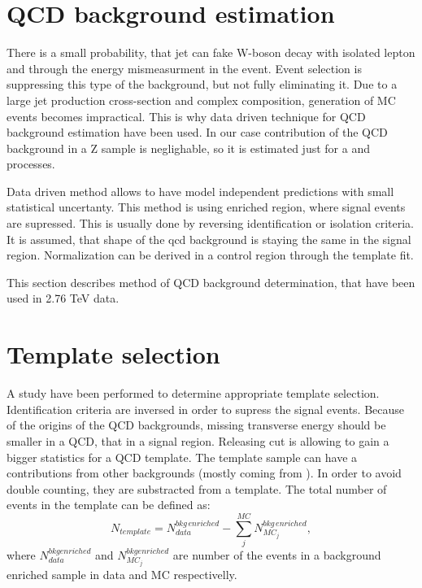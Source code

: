 \section{QCD background estimation}

There is a small probability, that jet can fake W-boson decay with isolated lepton and \etmiss through the energy mismeasurment in the event.  Event selection is suppressing this type of the background, but not fully eliminating it. Due to a large jet production cross-section and complex composition, generation of MC events becomes impractical. This is why data driven technique for QCD background estimation have been used. In our case contribution of the QCD background  in a Z sample is neglighable, so it is estimated just for a \wenu and \wmunu processes. 

Data driven method allows to have model independent predictions with small statistical uncertanty. This method is using \qcd enriched region, where signal events are supressed. This is usually done by reversing identification or isolation criteria. It is assumed, that shape of the qcd background is staying the same in the signal region. Normalization can  be derived in a control region through the template fit. 

This section describes method of QCD background determination, that have been used in 2.76 TeV data. 

\section{Template selection}

A study have been performed to determine appropriate template selection. Identification criteria are inversed in order to supress the signal events. Because of the origins of the QCD backgrounds, missing transverse energy \etmiss should be smaller in a QCD, that in a signal region. Releasing \etmiss cut is allowing to gain a bigger statistics for a QCD template.  The template sample can have a contributions from other backgrounds (mostly coming from \wlnu). In order to avoid double counting, they are substracted from a template. The total number of events in the template can be defined as:
\begin{equation}
N_{template} = N^{bkg\, enriched}_{data} - \sum_{j}^{MC} N_{MC_j}^{bkg\, enriched},
\end{equation}
where $N^{bkg enriched}_{data}$ and $N_{MC_j}^{bkg enriched}$ are number of the events in a background enriched sample in data and MC respectivelly. 

